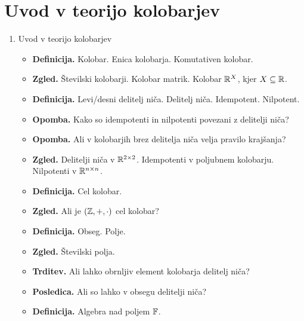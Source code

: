 \section{Uvod v teorijo kolobarjev}

\begin{enumerate}
    \item Uvod v teorijo kolobarjev
    \begin{itemize}
        \item \textbf{Definicija.} Kolobar. Enica kolobarja. Komutativen kolobar.
        \item \textbf{Zgled.} Številski kolobarji. Kolobar matrik. Kolobar \(\mathbb{R}^X\), kjer \(X \subseteq \mathbb{R}\).
        \item \textbf{Definicija.} Levi/desni delitelj niča. Delitelj niča. Idempotent. Nilpotent.
        \item \textbf{Opomba.} Kako so idempotenti in nilpotenti povezani z delitelji niča?
        \item \textbf{Opomba.} Ali v kolobarjih brez delitelja niča velja pravilo krajšanja?
        \item \textbf{Zgled.} Delitelji niča v $\mathbb{R}^{2 \times 2}$. Idempotenti v poljubnem kolobarju. Nilpotenti v \(\mathbb{R}^{n \times n}\).
        \item \textbf{Definicija.} Cel kolobar.
        \item \textbf{Zgled.} Ali je \((\mathbb{Z}, +, \cdot)\) cel kolobar?
        \item \textbf{Definicija.} Obseg. Polje.
        \item \textbf{Zgled.} Številski polja.
        \item \textbf{Trditev.} Ali lahko obrnljiv element kolobarja delitelj niča?
        \item \textbf{Posledica.} Ali so lahko v obsegu delitelji niča? 
        \item \textbf{Definicija.} Algebra nad poljem \(\mathbb{F}\).
    \end{itemize}


\end{enumerate}
